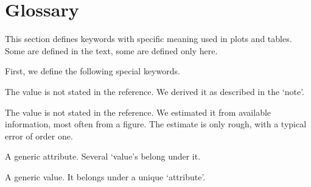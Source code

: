 \documentclass[aps, prx, showpacs, twocolumn, superscriptaddress, notitlepage, longbibliography, floatfix, nofootinbib]{revtex4-2}
\newcommand{\estimated}{\textit{(estimated) }}
\newcommand{\derived}{\textit{(derived) }}
\newif\ifFirstTableOnly
\newcommand{\myKey}[1]{$\whitearrowupfrombar$\textit{#1}}
\renewcommand{\myKey}[1]{\textit{#1}}
\renewcommand{\myKey}[1]{`{#1}'}
\newcommand{\key}[1]{$\whitearrowupfrombar$\textit{#1}}
\newcommand{\val}[1]{\rotatebox[origin=c]{180}{$\whitearrowupfrombar$}\textit{#1}}
\renewcommand{\key}[1]{\myKey{#1}}
\renewcommand{\val}[1]{\myKey{#1}}
\newcommand{\separate}[1]
{
 #1
}
\begin{document}
\begin{widetext}

\addtocounter{table}{-1}
\addtocounter{subtable}{+1}

\addtocounter{table}{+1}



\renewcommand\thetable{\Roman{table}}
\addtocounter{table}{-1}\label{tab:qubitArrays}

\renewcommand\thetable{\Roman{table}-\arabic{subtable}}
\setcounter{subtable}{1}


\addtocounter{table}{-1}
\addtocounter{subtable}{+1}

\ifFirstTableOnly \else

\addtocounter{table}{-1}
\addtocounter{subtable}{+1}
\fi

\addtocounter{table}{+1}

\renewcommand\thetable{\Roman{table}}

\phantom{x}

\end{widetext}

\renewcommand{\separate}[1]
{
 \vspace{0.5cm}
  \vspace{0.5cm}
  \noindent 
 #1
 \vspace{0.5cm}
  \vspace{0.5cm}
}

\section{Glossary}

\label{sec:vocabulary}

\newcommand{\keyword}[2]{\myKey{#1}. #2\\}

This section defines keywords with specific meaning used in plots and tables. Some are defined in the text, some are defined only here. 

\separate{First, we define the following special keywords.}

\begin{description}[leftmargin=5mm, topsep=0mm]
\item[\val{\derived}] The value is not stated in the reference.  We derived it as described in the \val{note}.
\item[\val{\estimated}] The value is not stated in the reference. We estimated it from available information, most often from a figure. The estimate is only rough, with a typical error of order one.
\item[\key{attribute}] A generic attribute. Several \val{value}s belong under it.
\item[\key{value}] A generic value. It belongs under a unique \val{attribute}.
\end{description}
\end{document}
